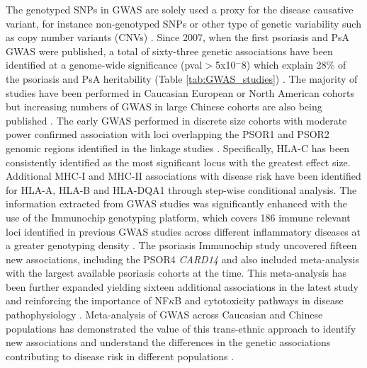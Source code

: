 The genotyped SNPs in GWAS are solely used a proxy for the disease causative variant, for instance non-genotyped SNPs or other type of genetic variability such as copy number variants (CNVs) \parencite{Hirschhorn2005, Ku2010}.
Since 2007, when the first psoriasis and PsA GWAS were published, a total of sixty-three genetic associations have been identified at a genome-wide significance (pval$>$5x10$^-8$) which explain 28\% of the psoriasis and PsA heritability (Table \ref{tab:GWAS_studies}) \parencite{Tsoi2017}. The majority of studies have been performed in Caucasian European or North American cohorts but increasing numbers of GWAS in large Chinese cohorts are also being published \parencite{Zhang2009, Sun2010, Yin2015}. The early GWAS performed in discrete size cohorts with moderate power confirmed association with loci overlapping the PSOR1 and PSOR2 genomic regions identified in the linkage studies \parencite{Cargill2007,Strange2010}. Specifically, HLA-C has been consistently identified as the most significant locus with the greatest effect size. Additional MHC-I and MHC-II associations with disease risk have been identified for HLA-A, HLA-B and HLA-DQA1 through step-wise conditional analysis\parencite{Okada2014}. 
The information extracted from GWAS studies was significantly enhanced with the use of the Immunochip genotyping platform, which covers 186 immune relevant loci identified in previous GWAS studies across different inflammatory diseases at a greater genotyping density \parencite{Tsoi2012}. The psoriasis Immunochip study uncovered fifteen new associations, including the PSOR4 \textit{CARD14} and also included meta-analysis with the largest available psoriasis cohorts at the time\parencite{Tsoi2012}. This meta-analysis has been further expanded yielding sixteen additional associations in the latest study and reinforcing the importance of NF$\kappa$B and cytotoxicity pathways in disease pathophysiology \parencite{Tsoi2015,Tsoi2017}. Meta-analysis of GWAS across Caucasian and Chinese populations has demonstrated the value of this trans-ethnic approach to identify new associations and understand the differences in the genetic associations contributing to disease risk in different populations \parencite{Yin2015}. 

